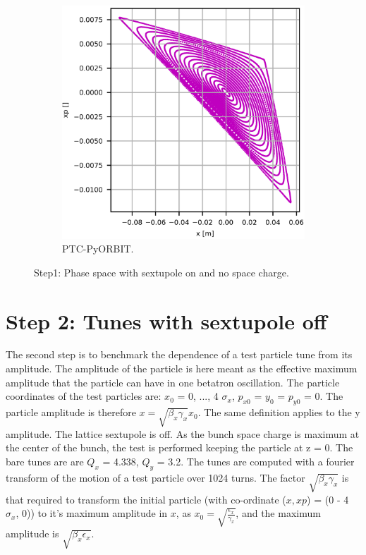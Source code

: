 \documentclass[a4paper]{cernatsnote}
\begin{document}
\begin{figure}
\begin{subfigure}{.5\textwidth}
          \includegraphics[width=\textwidth]{Step1_phase-space_PO.png}
          \caption{PTC-PyORBIT.}
          \label{fig:step1_po}
        \end{subfigure}
        \caption{Step1: Phase space with sextupole on and no space charge.}
        \label{fig:step1}
\end{figure}

\section{Step 2: Tunes with sextupole off}

The second step is to benchmark the dependence of a test particle tune from its amplitude. The amplitude of the particle is here meant as the effective maximum amplitude that the particle can have in one betatron oscillation. The particle coordinates of the test particles are: $x_0$ = 0, ..., 4 $\sigma_x$, $p_{x0}$ = $y_0$ = $p_{y0}$ = 0. The particle amplitude is therefore $x = \sqrt{\beta_x \gamma_x} x_0$. The same definition applies to the y amplitude. The lattice sextupole is off. As the bunch space charge is maximum at the center of the bunch, the test is performed keeping the particle at z = 0. The bare tunes are are $Q_x$ = 4.338, $Q_y$ = 3.2. The tunes are computed with a fourier transform of the motion of a test particle over 1024 turns. 
The factor $\sqrt{\beta_x \gamma_x}$ is that required to transform the initial particle (with co-ordinate ($x,xp$) = (0 - 4 $\sigma_x$, 0)) to it's maximum amplitude in $x$, as $x_0 = \sqrt{\frac{\epsilon_x}{\gamma_x}}$, and the maximum amplitude is $\sqrt{\beta_x \epsilon_x}$.
\end{document}
